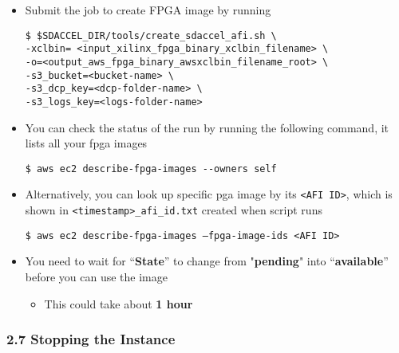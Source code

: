 \documentclass[]{article}
\begin{document}
\begin{itemize}
\item
  Submit the job to create FPGA image by running

\begin{verbatim}
$ $SDACCEL_DIR/tools/create_sdaccel_afi.sh \
-xclbin= <input_xilinx_fpga_binary_xclbin_filename> \
-o=<output_aws_fpga_binary_awsxclbin_filename_root> \
-s3_bucket=<bucket-name> \
-s3_dcp_key=<dcp-folder-name> \
-s3_logs_key=<logs-folder-name>
\end{verbatim}
\end{itemize}

\begin{itemize}
\item
  You can check the status of the run by running the following command,
  it lists all your fpga images

\begin{verbatim}
$ aws ec2 describe-fpga-images --owners self
\end{verbatim}
\end{itemize}

\begin{itemize}
\item
  Alternatively, you can look up specific pga image by its
  \texttt{\textless{}AFI\ ID\textgreater{}}, which is shown in
  \texttt{\textless{}timestamp\textgreater{}\_afi\_id.txt} created when
  script runs

\begin{verbatim}
$ aws ec2 describe-fpga-images –fpga-image-ids <AFI ID>
\end{verbatim}
\end{itemize}

\begin{itemize}
\item
  You need to wait for ``\textbf{State}'' to change from
  "\textbf{pending}" into ``\textbf{available}'' before you can use the
  image

  \begin{itemize}
  \item
    This could take about \textbf{1 hour}
  \end{itemize}
\end{itemize}

\hypertarget{header-n373}{%
\subsubsection{2.7 Stopping the Instance}\label{header-n373}}
\end{document}
